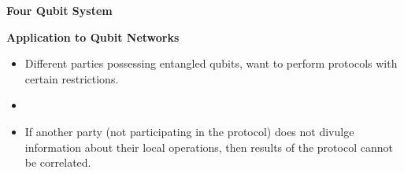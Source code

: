 \documentclass[usenames,dvipsnames]{beamer}
\begin{document}
	\begin{frame}{\textbf{Four Qubit System}}
		
	\end{frame}
	\begin{frame}{\textbf{Application to Qubit Networks}}
		\begin{itemize}
			\item {} {Different parties possessing entangled qubits, want to perform protocols with certain restrictions. }
			\item {}
			\item {} {If another party (not participating in the protocol) does not divulge information about their local operations, then results of the protocol cannot be correlated.}
		\end{itemize}
		\begin{figure}
			\centering
\end{figure}
\end{frame}
\end{document}
